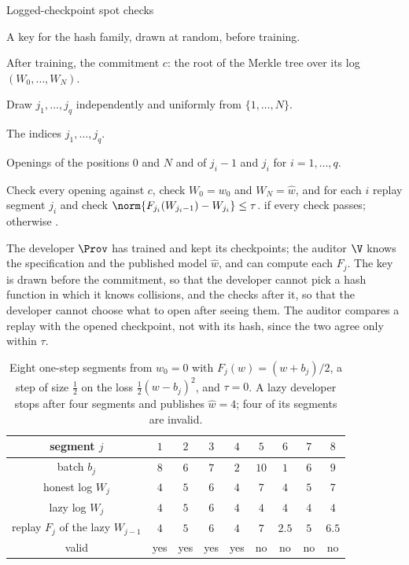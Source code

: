 \begin{refsection}
\begin{protocol}{Logged-checkpoint spot checks}\label{prot:training:spot}
\item[\msg{V}{P}] A key for the hash family, drawn at random, before training.
\item[\msg{P}{V}] After training, the commitment $c$: the root of the Merkle tree over its log $(W_0,\dots,W_N)$.
\item[\act{V}] Draw $j_1,\dots,j_q$ independently and uniformly from $\{1,\dots,N\}$.
\item[\msg{V}{P}] The indices $j_1,\dots,j_q$.
\item[\msg{P}{V}] Openings of the positions $0$ and $N$ and of $j_i-1$ and $j_i$ for $i=1,\dots,q$.
\item[\act{V}] Check every opening against $c$, check $W_0=w_0$ and $W_N=\hat w$, and for each $i$ replay segment $j_i$ and check $\norm{F_{j_i}(W_{j_i-1})-W_{j_i}}\le\tau$. \acc{} if every check passes; otherwise \rej.
\end{protocol}

The developer $\Prov$ has trained and kept its checkpoints; the auditor $\V$ knows the specification and the published model $\hat w$, and can compute each $F_j$. The key is drawn before the commitment, so that the developer cannot pick a hash function in which it knows collisions, and the checks after it, so that the developer cannot choose what to open after seeing them. The auditor compares a replay with the opened checkpoint, not with its hash, since the two agree only within $\tau$.

\begin{table}[t]
\centering\small
\begin{tabular}{@{}c c c c c c c c c@{}}
\toprule
segment $j$ & $1$ & $2$ & $3$ & $4$ & $5$ & $6$ & $7$ & $8$\\
\midrule
batch $b_j$ & $8$ & $6$ & $7$ & $2$ & $10$ & $1$ & $6$ & $9$\\
honest log $W_j$ & $4$ & $5$ & $6$ & $4$ & $7$ & $4$ & $5$ & $7$\\
lazy log $W_j$ & $4$ & $5$ & $6$ & $4$ & $4$ & $4$ & $4$ & $4$\\
replay $F_j$ of the lazy $W_{j-1}$ & $4$ & $5$ & $6$ & $4$ & $7$ & $2.5$ & $5$ & $6.5$\\
valid & yes & yes & yes & yes & no & no & no & no\\
\bottomrule
\end{tabular}
\caption{Eight one-step segments from $w_0=0$ with $F_j(w)=(w+b_j)/2$, a step of size $\frac12$ on the loss $\frac12(w-b_j)^2$, and $\tau=0$. A lazy developer stops after four segments and publishes $\hat w=4$; four of its segments are invalid.}\label{tab:training:run}
\end{table}


\end{refsection}
